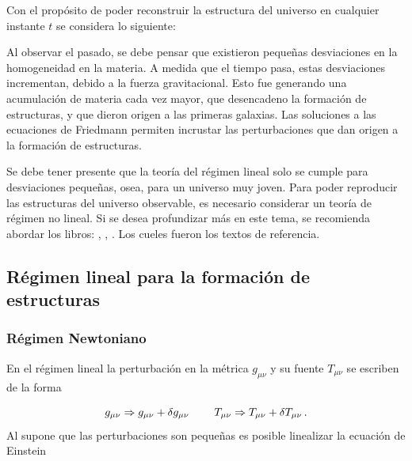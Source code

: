 Con el propósito de poder reconstruir la estructura del universo en cualquier instante $t$ se considera lo siguiente:

Al observar el pasado, se debe pensar que existieron pequeñas desviaciones en la homogeneidad en la materia. A medida que el tiempo pasa, estas desviaciones incrementan, debido a la fuerza gravitacional. Esto fue generando una acumulación de materia cada vez mayor, que desencadeno la formación de estructuras, y que dieron origen a las primeras galaxias. Las soluciones a las ecuaciones de Friedmann permiten incrustar las perturbaciones que dan origen a la formación de estructuras.

Se debe tener presente que la teoría del régimen lineal solo se cumple para desviaciones pequeñas, osea, para un universo muy joven. Para poder reproducir las estructuras del universo observable, es necesario considerar un teoría de régimen no lineal. Si se desea profundizar más en este tema, se recomienda abordar los libros: \cite{padmanabhan1995}, \cite{longair2008}, \cite{coles2002}. Los cueles fueron los textos de referencia.


\subsection{Régimen lineal para la formación de estructuras}
\label{subsec:Lineal_Estructure_Formation}


	\subsubsection{Régimen Newtoniano}
	\label{subsubsec:Newtonian_Regimen}


En el régimen lineal la perturbación en la métrica $g_{\mu\nu}$ y su fuente $T_{\mu\nu}$ se escriben de la forma

\begin{equation}
g_{\mu\nu} \Rightarrow g_{\mu\nu}+\delta g_{\mu\nu} \hspace{0.8cm} T_{\mu\nu} \Rightarrow T_{\mu\nu} +\delta T_{\mu\nu} \,.
\end{equation}
%
Al supone que las perturbaciones son pequeñas es posible linealizar la ecuación de Einstein 

